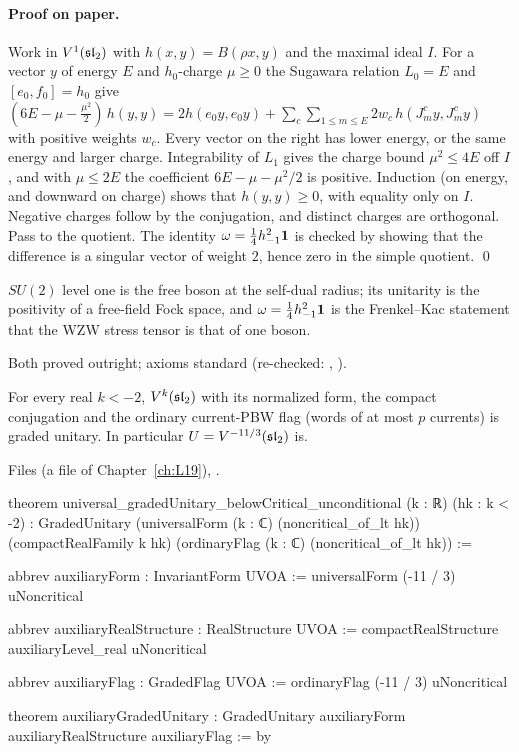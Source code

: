 \paragraph{Proof on paper.} Work in $V^1(\mathfrak{sl}_2)$ with $h(x,y)=B(\rho x,y)$ and the maximal ideal $I$. For a vector $y$ of energy $E$ and
$h_0$-charge $\mu\ge0$ the Sugawara relation $L_0=E$ and $[e_0,f_0]=h_0$ give
$(6E-\mu-\tfrac{\mu^2}{2})\,h(y,y)=2h(e_0y,e_0y)+\sum_c\sum_{1\le m\le E}2w_c\,h(J^c_my,J^c_my)$ with positive weights $w_c$. Every vector on the
right has lower energy, or the same energy and larger charge. Integrability of $L_1$ gives the charge bound $\mu^2\le4E$ off $I$, and with
$\mu\le2E$ the coefficient $6E-\mu-\mu^2/2$ is positive. Induction (on energy, and downward on charge) shows that $h(y,y)\ge0$, with equality
only on $I$. Negative charges follow by the conjugation, and distinct charges are orthogonal. Pass to the quotient. The identity
$\omega=\tfrac14h_{-1}^2\mathbf 1$ is checked by showing that the difference is a singular vector of weight $2$, hence zero in the simple
quotient. \qed

\begin{physics}
$SU(2)$ level one is the free boson at the self-dual radius; its unitarity is the positivity of a free-field Fock space, and
$\omega=\tfrac14h_{-1}^2\mathbf 1$ is the Frenkel--Kac statement that the WZW stress tensor is that of one boson.
\end{physics}

\begin{status}
Both proved outright; axioms standard (re-checked: , ).
\end{status}

\begin{theorem}\label{l28:thm:aux}
For every real $k<-2$, $V^k(\mathfrak{sl}_2)$ with its normalized form, the compact conjugation and the ordinary current-PBW flag (words of at
most $p$ currents) is graded unitary. In particular $U=V^{-11/3}(\mathfrak{sl}_2)$ is.
\end{theorem}

\noindent Files  (a file of Chapter~\ref{ch:L19}),
.
\begin{leancode}
theorem universal_gradedUnitary_belowCritical_unconditional (k : ℝ) (hk : k < -2) :
    GradedUnitary (universalForm (k : ℂ) (noncritical_of_lt hk)) (compactRealFamily k hk)
      (ordinaryFlag (k : ℂ) (noncritical_of_lt hk)) :=

abbrev auxiliaryForm : InvariantForm UVOA := universalForm (-11 / 3) uNoncritical

abbrev auxiliaryRealStructure : RealStructure UVOA :=
  compactRealStructure auxiliaryLevel_real uNoncritical

abbrev auxiliaryFlag : GradedFlag UVOA := ordinaryFlag (-11 / 3) uNoncritical

theorem auxiliaryGradedUnitary :
    GradedUnitary auxiliaryForm auxiliaryRealStructure auxiliaryFlag := by
\end{leancode}

